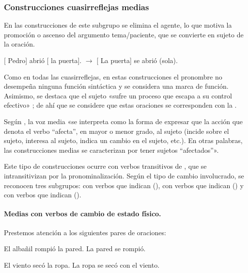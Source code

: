 \subsubsection{Construcciones cuasirreflejas medias}\label{sec:10-medias}

En las construcciones de este subgrupo se elimina el agente, lo que motiva la
promoción o ascenso del argumento tema/paciente, que se convierte en sujeto de
la oración.

\begin{exe}
  \ex {}[ Pedro] abrió [ la puerta]. $\rightarrow$
      [ La puerta] se abrió (sola).
\end{exe}

Como en todas las cuasirreflejas, en estas construcciones el pronombre no
desempeña ninguna función sintáctica y se considera una marca de función.
Asimismo, se destaca que el sujeto «sufre un proceso que escapa a su control
efectivo» \parencite[77]{sanchezlopez2002}; de ahí que se considere que estas
oraciones se corresponden con la .

\begin{destacado}
Según \textcite[1636]{mendikoetxea1999}, la voz media «se interpreta como la
forma de expresar que la acción que denota el verbo “afecta”, en mayor o menor
grado, al sujeto (incide sobre el sujeto, interesa al sujeto, indica un cambio en
el sujeto, etc.). En otras palabras, las construcciones medias se caracterizan
por tener sujetos “afectados”».
\end{destacado}

Este tipo de construcciones ocurre con verbos transitivos de , que se intransitivizan por la pronominalización. Según el tipo de cambio
involucrado, se reconocen tres subgrupos: con verbos que indican  (), con verbos que indican
 () y
con verbos que indican  ().

\paragraph{Medias con verbos de cambio de estado físico.} Prestemos atención a
los siguientes pares de oraciones:

\begin{exe}
  \ex\label{ex:10-pared}
    \begin{xlist}
      \ex\label{ex:10-pared-a} El albañil rompió la pared.
      \ex\label{ex:10-pared-b} La pared se rompió.
    \end{xlist}
  \ex\label{ex:10-ropa}
    \begin{xlist}
      \ex\label{ex:10-ropa-a} El viento secó la ropa.
      \ex\label{ex:10-ropa-b} La ropa se secó con el viento.
    \end{xlist}
\end{exe}

